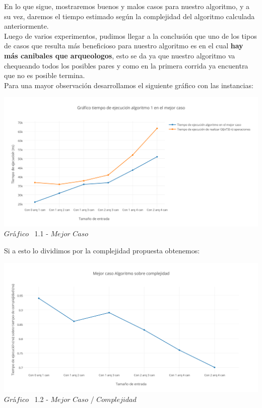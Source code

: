 \indent En lo que sigue, mostraremos buenos y malos casos para nuestro algoritmo, y a su vez, daremos el tiempo estimado 
seg\'un la complejidad del algoritmo calculada anteriormente.\\

Luego de varios experimentos, pudimos llegar a la conclusi\'on que uno de los tipos de casos que resulta m\'as beneficioso para nuestro algoritmo
es en el cual \textbf{hay m\'as canibales que arqueologos}, esto se da ya que nuestro algoritmo va chequeando todos los posibles pares y como en la primera corrida ya encuentra que no es posible termina.\\

Para una mayor observaci\'on desarrollamos el siguiente gr\'afico con las instancias:\\

\vspace*{0.3cm} \vspace*{0.3cm}
  \begin{center}
 \includegraphics[scale=0.6]{./EJ1/mejorcasoej1.png}
 {$Gr$\'a$fico$ \ 1.1 - $Mejor$ $Caso$}
  \end{center}
  \vspace*{0.3cm}


Si a esto lo dividimos por la complejidad propuesta obtenemos:\\

\vspace*{0.3cm} \vspace*{0.3cm}
  \begin{center}
 \includegraphics[scale=0.6]{./EJ1/mejorcasoej11.png}
 {$Gr$\'a$fico$ \ 1.2 - $Mejor$ $Caso$ / $Complejidad$}
  \end{center}
  \vspace*{0.3cm}

